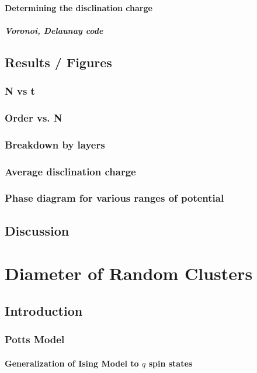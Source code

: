 \documentclass{umthesis}
\begin{document}
\subsubsection{Determining the disclination charge}
\label{sec-2.2.3.4}
\paragraph{Voronoi, Delaunay code}
\label{sec-2.2.3.4.1}
\section{Results / Figures}
\label{sec-2.3}
\subsection{N vs t}
\label{sec-2.3.1}
\subsection{Order vs. N}
\label{sec-2.3.2}
\subsection{Breakdown by layers}
\label{sec-2.3.3}
\subsection{Average disclination charge}
\label{sec-2.3.4}
\subsection{Phase diagram for various ranges of potential}
\label{sec-2.3.5}
\section{Discussion}
\label{sec-2.4}
\chapter{Diameter of Random Clusters}
\label{sec-3}
\section{Introduction}
\label{sec-3.1}
\subsection{Potts Model \cite{Wu82}}
\label{sec-3.1.1}
\subsubsection{Generalization of Ising Model to $q$ spin states}
\label{sec-3.1.1.1}
\end{document}
